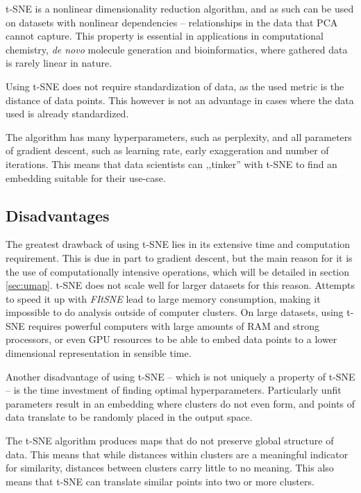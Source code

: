 t-SNE is a nonlinear dimensionality reduction algorithm, and as such can be used on datasets with nonlinear dependencies -- relationships in the data that PCA cannot capture. This property is essential in applications in computational chemistry, \textit{de novo} molecule generation and bioinformatics, where gathered data is rarely linear in nature.

Using t-SNE does not require standardization of data, as the used metric is the distance of data points. This however is not an advantage in cases where the data used is already standardized.

The algorithm has many hyperparameters, such as perplexity, and all parameters of gradient descent, such as learning rate, early exaggeration and number of iterations. This means that data scientists can ,,tinker'' with t-SNE to find an embedding suitable for their use-case.

\subsection{Disadvantages}

The greatest drawback of using t-SNE lies in its extensive time and computation requirement. This is due in part to gradient descent, but the main reason for it is the use of computationally intensive operations, which will be detailed in section \ref{sec:umap}. t-SNE does not scale well for larger datasets for this reason. Attempts to speed it up with \textit{FItSNE}\cite{bib:tsne:FItSNE} lead to large memory consumption, making it impossible to do analysis outside of computer clusters. On large datasets, using t-SNE requires powerful computers with large amounts of RAM and strong processors, or even GPU resources to be able to embed data points to a lower dimensional representation in sensible time.

Another disadvantage of using t-SNE -- which is not uniquely a property of t-SNE -- is the time investment of finding optimal hyperparameters. Particularly unfit parameters result in an embedding where clusters do not even form, and points of data translate to be randomly placed in the output space.\cite{bib:distill}

The t-SNE algorithm produces maps that do not preserve global structure of data. This means that while distances within clusters are a meaningful indicator for similarity, distances between clusters carry little to no meaning. This also means that t-SNE can translate similar points into two or more clusters.

